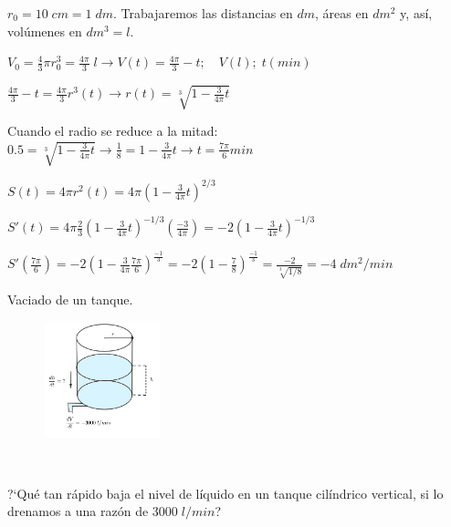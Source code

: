 	\begin{proofw}\renewcommand{\qedsymbol}{$\diamond$}
		
	$r_0=10\; cm = 1 \; dm$. Trabajaremos las distancias en $dm$, áreas en $dm^2$ y, así, volúmenes en $dm^3=l$.
	
	$V_0=\frac 4 3 \pi r_0^3=\frac {4\pi}{3}\; l \to V(t)=\frac {4\pi}{3}-t; \quad V(l); \; t(min)$
	
	$\frac {4\pi}{3}-t=\frac {4\pi}{3}r^3(t) \to r(t)=\sqrt[3]{1-\frac {3}{4\pi}t}$
	
	Cuando el radio se reduce a la mitad: $0.5=\sqrt[3]{1-\frac {3}{4\pi}t} \to \frac 1 8 = 1-\frac {3}{4\pi}t \to t=\frac {7\pi}{6} min$
	
	$S(t)=4\pi r^2(t)=4\pi \left( 1 - \frac {3}{4\pi} t \right)^{2/3}$
	
	$S'(t)=4\pi \frac 2 3 \left( 1 - \frac {3}{4\pi} t \right)^{-1/3} \left( \frac {-3}{4\pi} \right)= -2 \left( 1 - \frac {3}{4\pi} t \right)^{-1/3}$
	
	$S'(\frac {7\pi}{6})=-2 \left(1- \frac {3}{4\pi} \frac {7\pi}{6} \right)^{\frac {-1}{3}}= -2 \left( 1-\frac 7 8 \right)^{\frac {-1}{3}}=\frac {-2}{\sqrt[3]{1/8}}=-4 \; dm^2/min$
		
	\end{proofw}
	
	
	\begin{ejre} Vaciado de un tanque.
	
	\begin{multicols}{2}
	
	\begin{figure}[H]
	\centering
	\includegraphics[width=0.3\textwidth]{imagenes/imagenes04/cilindro.png}
	\end{figure}
	
	$\quad$
	
	?`Qué tan rápido baja el nivel de líquido en un tanque cilíndrico vertical, si lo drenamos a una razón de $3000 \; l/min$?
		
	\end{multicols}

	\end{ejre}
	

